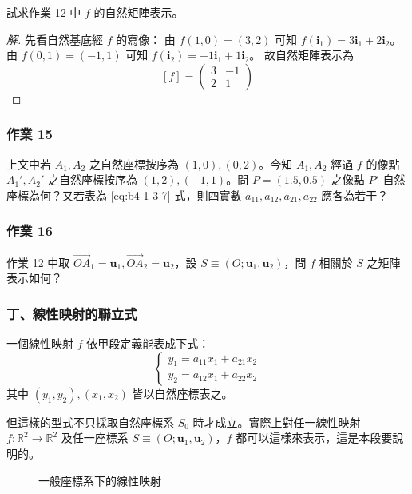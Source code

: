 \begin{example}[例 5]
試求作業 12 中 $f$ 的自然矩陣表示。
\end{example}

\begin{proof}[解]
先看自然基底經 $f$ 的寫像：
由 $f(1, 0) = (3, 2)$ 可知 $f(\mathbf{i}_1) = 3\mathbf{i}_1 + 2\mathbf{i}_2$。
由 $f(0, 1) = (-1, 1)$ 可知 $f(\mathbf{i}_2) = -1\mathbf{i}_1 + 1\mathbf{i}_2$。
故自然矩陣表示為
\[ [f] = \begin{pmatrix} 3 & -1 \\ 2 & 1 \end{pmatrix} \]
\end{proof}

\subsubsection*{作業 15}
上文中若 $A_1, A_2$ 之自然座標按序為 $(1, 0), (0, 2)$。今知 $A_1, A_2$ 經過 $f$ 的像點 $A_1', A_2'$ 之自然座標按序為 $(1, 2), (-1, 1)$。問 $P = (1.5, 0.5)$ 之像點 $P'$ 自然座標為何？又若表為 \eqref{eq:b4-1-3-7} 式，則四實數 $a_{11}, a_{12}, a_{21}, a_{22}$ 應各為若干？

\subsubsection*{作業 16}
作業 12 中取 $\vec{OA}_1 = \mathbf{u}_1, \vec{OA}_2 = \mathbf{u}_2$，設 $S \equiv (O; \mathbf{u}_1, \mathbf{u}_2)$，問 $f$ 相關於 $S$ 之矩陣表示如何？

\subsubsection*{丁、線性映射的聯立式}

一個線性映射 $f$ 依甲段定義能表成下式：
\begin{equation}
\begin{cases}
y_1 = a_{11}x_1 + a_{21}x_2 \\
y_2 = a_{12}x_1 + a_{22}x_2
\end{cases} \label{eq:b4-1-3-9}
\end{equation}
其中 $(y_1, y_2), (x_1, x_2)$ 皆以自然座標表之。

但這樣的型式不只採取自然座標系 $S_0$ 時才成立。實際上對任一線性映射 $f: \mathbb{R}^2 \to \mathbb{R}^2$ 及任一座標系 $S \equiv (O; \mathbf{u}_1, \mathbf{u}_2)$，$f$ 都可以這樣來表示，這是本段要說明的。

\begin{figure}[H]
\centering
{}
\caption{一般座標系下的線性映射}
\label{fig:b4-1-3-6}
\end{figure}

